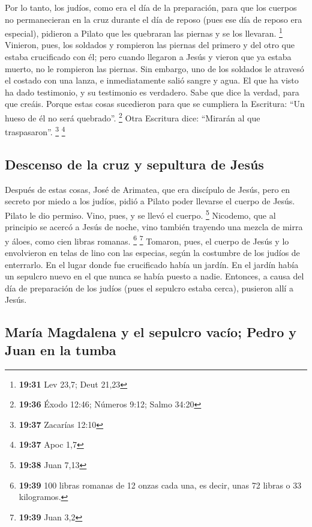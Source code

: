  Por lo tanto, los judíos, como era el día de la
preparación, para que los cuerpos no permanecieran en la cruz durante el
día de reposo (pues ese día de reposo era especial), pidieron a Pilato
que les quebraran las piernas y se los llevaran. \footnote{\textbf{19:31}
  Lev 23,7; Deut 21,23}  Vinieron, pues, los soldados y
rompieron las piernas del primero y del otro que estaba crucificado con
él;  pero cuando llegaron a Jesús y vieron que ya estaba
muerto, no le rompieron las piernas.  Sin embargo, uno de
los soldados le atravesó el costado con una lanza, e inmediatamente
salió sangre y agua.  El que ha visto ha dado testimonio,
y su testimonio es verdadero. Sabe que dice la verdad, para que creáis.
 Porque estas cosas sucedieron para que se cumpliera la
Escritura: ``Un hueso de él no será quebrado''. \footnote{\textbf{19:36}
  Éxodo 12:46; Números 9:12; Salmo 34:20}  Otra Escritura
dice: ``Mirarán al que traspasaron''. \footnote{\textbf{19:37} Zacarías
  12:10} \footnote{\textbf{19:37} Apoc 1,7}

\hypertarget{descenso-de-la-cruz-y-sepultura-de-jesuxfas}{%
\subsection{Descenso de la cruz y sepultura de
Jesús}\label{descenso-de-la-cruz-y-sepultura-de-jesuxfas}}

 Después de estas cosas, José de Arimatea, que era
discípulo de Jesús, pero en secreto por miedo a los judíos, pidió a
Pilato poder llevarse el cuerpo de Jesús. Pilato le dio permiso. Vino,
pues, y se llevó el cuerpo. \footnote{\textbf{19:38} Juan 7,13}
 Nicodemo, que al principio se acercó a Jesús de noche,
vino también trayendo una mezcla de mirra y áloes, como cien libras
romanas. \footnote{\textbf{19:39} 100 libras romanas de 12 onzas cada
  una, es decir, unas 72 libras o 33 kilogramos.} \footnote{\textbf{19:39}
  Juan 3,2}  Tomaron, pues, el cuerpo de Jesús y lo
envolvieron en telas de lino con las especias, según la costumbre de los
judíos de enterrarlo.  En el lugar donde fue crucificado
había un jardín. En el jardín había un sepulcro nuevo en el que nunca se
había puesto a nadie.  Entonces, a causa del día de
preparación de los judíos (pues el sepulcro estaba cerca), pusieron allí
a Jesús.

\hypertarget{maruxeda-magdalena-y-el-sepulcro-vacuxedo-pedro-y-juan-en-la-tumba}{%
\subsection{María Magdalena y el sepulcro vacío; Pedro y Juan en la
tumba}\label{maruxeda-magdalena-y-el-sepulcro-vacuxedo-pedro-y-juan-en-la-tumba}}

